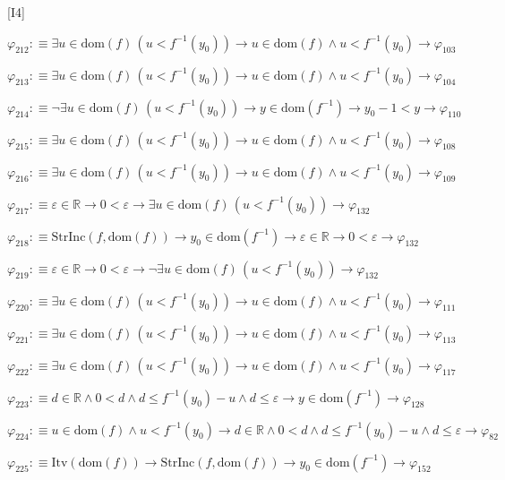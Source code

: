 \begin{fullproof}{[I4]}
\begin{abbrevlist}
\item $\varphi_{212} :\equiv \exists u \in \mathrm{dom}(f)\,(u < f^{-1}(y_{0})) \to u \in \mathrm{dom}(f) \land u < f^{-1}(y_{0}) \to \varphi_{103}$
\item $\varphi_{213} :\equiv \exists u \in \mathrm{dom}(f)\,(u < f^{-1}(y_{0})) \to u \in \mathrm{dom}(f) \land u < f^{-1}(y_{0}) \to \varphi_{104}$
\item $\varphi_{214} :\equiv \neg \exists u \in \mathrm{dom}(f)\,(u < f^{-1}(y_{0})) \to y \in \mathrm{dom}(f^{-1}) \to y_{0} - 1 < y \to \varphi_{110}$
\item $\varphi_{215} :\equiv \exists u \in \mathrm{dom}(f)\,(u < f^{-1}(y_{0})) \to u \in \mathrm{dom}(f) \land u < f^{-1}(y_{0}) \to \varphi_{108}$
\item $\varphi_{216} :\equiv \exists u \in \mathrm{dom}(f)\,(u < f^{-1}(y_{0})) \to u \in \mathrm{dom}(f) \land u < f^{-1}(y_{0}) \to \varphi_{109}$
\item $\varphi_{217} :\equiv \varepsilon \in \mathbb{R} \to 0 < \varepsilon \to \exists u \in \mathrm{dom}(f)\,(u < f^{-1}(y_{0})) \to \varphi_{132}$
\item $\varphi_{218} :\equiv \mathrm{StrInc}(f,\mathrm{dom}(f)) \to y_{0} \in \mathrm{dom}(f^{-1}) \to \varepsilon \in \mathbb{R} \to 0 < \varepsilon \to \varphi_{132}$
\item $\varphi_{219} :\equiv \varepsilon \in \mathbb{R} \to 0 < \varepsilon \to \neg \exists u \in \mathrm{dom}(f)\,(u < f^{-1}(y_{0})) \to \varphi_{132}$
\item $\varphi_{220} :\equiv \exists u \in \mathrm{dom}(f)\,(u < f^{-1}(y_{0})) \to u \in \mathrm{dom}(f) \land u < f^{-1}(y_{0}) \to \varphi_{111}$
\item $\varphi_{221} :\equiv \exists u \in \mathrm{dom}(f)\,(u < f^{-1}(y_{0})) \to u \in \mathrm{dom}(f) \land u < f^{-1}(y_{0}) \to \varphi_{113}$
\item $\varphi_{222} :\equiv \exists u \in \mathrm{dom}(f)\,(u < f^{-1}(y_{0})) \to u \in \mathrm{dom}(f) \land u < f^{-1}(y_{0}) \to \varphi_{117}$
\item $\varphi_{223} :\equiv d \in \mathbb{R} \land 0 < d \land d \leq f^{-1}(y_{0}) - u \land d \leq \varepsilon \to y \in \mathrm{dom}(f^{-1}) \to \varphi_{128}$
\item $\varphi_{224} :\equiv u \in \mathrm{dom}(f) \land u < f^{-1}(y_{0}) \to d \in \mathbb{R} \land 0 < d \land d \leq f^{-1}(y_{0}) - u \land d \leq \varepsilon \to \varphi_{82}$
\item $\varphi_{225} :\equiv \mathrm{Itv}(\mathrm{dom}(f)) \to \mathrm{StrInc}(f,\mathrm{dom}(f)) \to y_{0} \in \mathrm{dom}(f^{-1}) \to \varphi_{152}$

\end{abbrevlist}
\end{fullproof}
